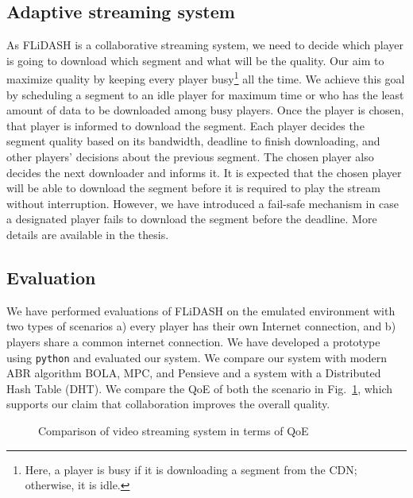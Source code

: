 \subsection{Adaptive streaming system}
As FLiDASH is a collaborative streaming system, we need to decide which player is going to download which segment and what will be the quality. Our aim to maximize quality by keeping every player busy\footnote{Here, a player is busy if it is downloading a segment from the CDN; otherwise, it is idle.} all the time. We achieve this goal by scheduling a segment to an idle player for maximum time or who has the least amount of data to be downloaded among busy players. Once the player is chosen, that player is informed to download the segment. Each player decides the segment quality based on its bandwidth, deadline to finish downloading, and other players' decisions about the previous segment. The chosen player also decides the next downloader and informs it. It is expected that the chosen player will be able to download the segment before it is required to play the stream without interruption. However, we have introduced a fail-safe mechanism in case a designated player fails to download the segment before the deadline. More details are available in the thesis.

\subsection{Evaluation}
We have performed evaluations of FLiDASH on the emulated environment with two types of scenarios a) every player has their own Internet connection, and b) players share a common internet connection. We have developed a prototype using {\tt python} and evaluated our system. We compare our system with modern ABR algorithm BOLA, MPC, and Pensieve and a system with a Distributed Hash Table (DHT). We compare the QoE of both the scenario in Fig.~\ref{fig:FLiDASH:QoE}, which supports our claim that collaboration improves the overall quality.
\begin{figure}[h]
	\captionsetup[subfigure]{width=0.49\linewidth}
	\begin{center}
	\end{center}
	\caption{\label{fig:FLiDASH:QoE}Comparison of video streaming system in terms of QoE}
\end{figure}
